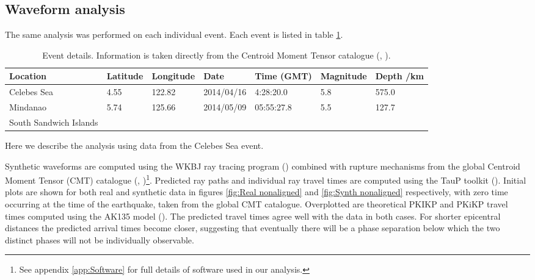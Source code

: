 \documentclass[11pt,a4paper]{article}
\begin{document}
\subsection{Waveform analysis}
\label{sec:Waveforms}
The same analysis was performed on each individual event. Each event is listed in table \ref{tab:Events}.
\begin{table}
\centering
\begin{tabular}{| l | l | l | l | l | l | l |}
	\hline Location				& Latitude	& Longitude	& Date		& Time (GMT)	& Magnitude	& Depth /km 	\\
	\hline Celebes Sea			& 4.55	& 122.82		& 2014/04/16	& 4:28:20.0	& 5.8			& 575.0  		\\ 
	\hline Mindanao			& 5.74	& 125.66		& 2014/05/09	& 05:55:27.8	& 5.5			& 127.7		\\
	\hline South Sandwich Islands 	&		& 			& 			& 			& 			&			\\\hline	
\end{tabular}
\caption{Event details. Information is taken directly from the Centroid Moment Tensor catalogue (\cite{Dziewonski1981}, \cite{Ekstrom2012}).}
\label{tab:Events}
\end{table}
Here we describe the analysis using data from the Celebes Sea event.

Synthetic waveforms are computed using the WKBJ ray tracing program (\cite{Chapman1976}) combined with rupture mechanisms from the global Centroid Moment Tensor (CMT) catalogue (\cite{Dziewonski1981}, \cite{Ekstrom2012})\footnote{See appendix \ref{app:Software} for full details of software used in our analysis.}. Predicted ray paths and individual ray travel times are computed using the TauP toolkit (\cite{Crotwell1999}). Initial plots are shown for both real and synthetic data in figures \ref{fig:Real nonaligned} and \ref{fig:Synth nonaligned} respectively, with zero time occurring at the time of the earthquake, taken from the global CMT catalogue. Overplotted are theoretical PKIKP and PKiKP travel times computed using the AK135 model (\cite{Kennett1995b}). The predicted travel times agree well with the data in both cases.  For shorter epicentral distances the predicted arrival times become closer, suggesting that eventually there will be a phase separation below which the two distinct phases will not be individually observable.
\end{document}
